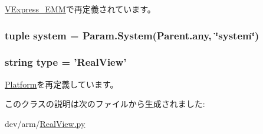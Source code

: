 \hyperlink{classRealView_1_1VExpress__EMM_a414ad47615ab498f1da72365f610ff63}{VExpress\_\-EMM}で再定義されています。\hypertarget{classRealView_1_1RealView_ab737471139f5a296e5b26e8a0e1b0744}{
\subsubsection[{system}]{\setlength{\rightskip}{0pt plus 5cm}tuple {\bf system} = Param.System(Parent.any, \char`\"{}system\char`\"{})}}
\label{classRealView_1_1RealView_ab737471139f5a296e5b26e8a0e1b0744}
\hypertarget{classRealView_1_1RealView_acce15679d830831b0bbe8ebc2a60b2ca}{
\subsubsection[{type}]{\setlength{\rightskip}{0pt plus 5cm}string {\bf type} = '{\bf RealView}'}}
\label{classRealView_1_1RealView_acce15679d830831b0bbe8ebc2a60b2ca}


\hyperlink{classPlatform_1_1Platform_acce15679d830831b0bbe8ebc2a60b2ca}{Platform}を再定義しています。

このクラスの説明は次のファイルから生成されました:\begin{DoxyCompactItemize}
\item 
dev/arm/\hyperlink{RealView_8py}{RealView.py}\end{DoxyCompactItemize}
